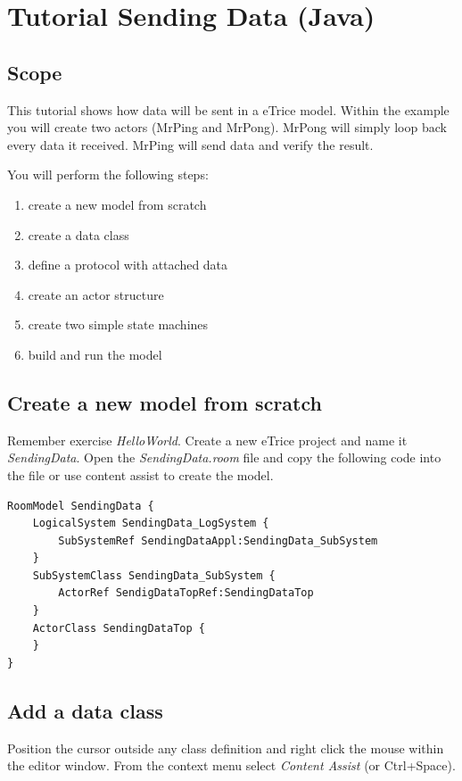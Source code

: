 \chapter{Tutorial Sending Data (Java)}

\section{Scope}

This tutorial shows how data will be sent in a eTrice model. Within the example you will create two actors (MrPing and MrPong). MrPong will simply loop back every data it received.
MrPing will send data and verify the result.   

You will perform the following steps:

\begin{enumerate}
\item create a new model from scratch
\item create a data class
\item define a protocol with attached data
\item create an actor structure
\item create two simple state machines
\item build and run the model
\end{enumerate}

\section{Create a new model from scratch}

Remember exercise \textit{HelloWorld}.
Create a new eTrice project and name it \textit{SendingData}.
Open the \textit{SendingData.room} file and copy the following code into the file or use content assist to create the model.


\begin{verbatim} 
RoomModel SendingData {
    LogicalSystem SendingData_LogSystem {
        SubSystemRef SendingDataAppl:SendingData_SubSystem 
    }
    SubSystemClass SendingData_SubSystem {
        ActorRef SendigDataTopRef:SendingDataTop 
    }
    ActorClass SendingDataTop {
    }
}
\end{verbatim}

\section{Add a data class}

Position the cursor outside any class definition and right click the mouse within the editor window. From the context menu select \textit{Content Assist} (or Ctrl+Space).  

